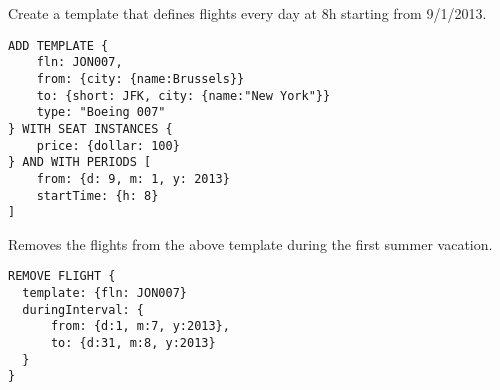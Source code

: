 \begin{texa}
  Create a template that defines flights every day at 8h starting from 9/1/2013.
  \begin{lstlisting}
ADD TEMPLATE {
    fln: JON007,
    from: {city: {name:Brussels}}
    to: {short: JFK, city: {name:"New York"}}
    type: "Boeing 007"
} WITH SEAT INSTANCES {
    price: {dollar: 100}
} AND WITH PERIODS [
    from: {d: 9, m: 1, y: 2013}
    startTime: {h: 8}
]
  \end{lstlisting}
  Removes the flights from the above template during the first summer vacation.
  \begin{lstlisting}
REMOVE FLIGHT {
  template: {fln: JON007}
  duringInterval: {
      from: {d:1, m:7, y:2013},
      to: {d:31, m:8, y:2013}
  }
}
  \end{lstlisting}
\end{texa}


